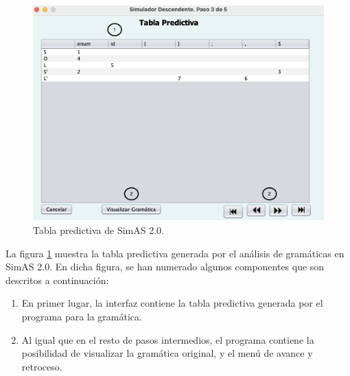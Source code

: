 \begin{figure}[htp]
 	\begin{center}
      \includegraphics[scale=0.5]{figuras/Cap3/SimAS2/paso3.png} 
       \caption{Tabla predictiva de SimAS 2.0.}\label{fig:SimAS-2.0-paso3}
 	\end{center}
\end{figure}

La figura \ref{fig:SimAS-2.0-paso3} muestra la tabla predictiva generada por el análisis de gramáticas en SimAS 2.0. En dicha figura, se han numerado algunos componentes que son descritos a continuación:
 \begin{enumerate}
     \item En primer lugar, la interfaz contiene la tabla predictiva generada por el programa para la gramática.
     \item Al igual que en el resto de pasos intermedios, el programa contiene la posibilidad de visualizar la gramática original, y el menú de avance y retroceso.
 \end{enumerate}

